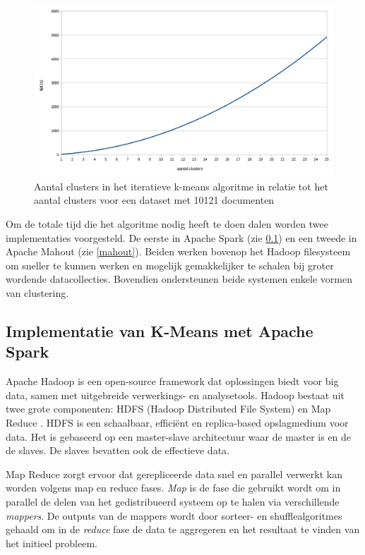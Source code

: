 \begin{figure}[h]
	\caption{Aantal clusters in het iteratieve k-means algoritme in relatie tot het aantal clusters voor een dataset met 10121 documenten}
	\label{fig:clustering-10000-exp}	
	\includegraphics[width=\textwidth]{fig/clustering-10000-exp.png}
\end{figure}

Om de totale tijd die het algoritme nodig heeft te doen dalen worden twee implementaties voorgesteld. De eerste in Apache Spark (zie \ref{spark}) en een tweede in Apache Mahout (zie \ref{mahout}). Beiden werken bovenop het Hadoop filesysteem om sneller te kunnen werken en mogelijk gemakkelijker te schalen bij groter wordende datacollecties. Bovendien ondersteunen beide systemen enkele vormen van clustering. 

\subsection{Implementatie van K-Means met Apache Spark}\label{spark}
Apache Hadoop \cite{hadoop} is een open-source framework dat oplossingen biedt voor big data, samen met uitgebreide verwerkings- en analysetools. Hadoop bestaat uit twee grote componenten: HDFS (Hadoop Distributed File System) en Map Reduce \cite{Dean}. HDFS is een schaalbaar, effici\"ent en replica-based opslagmedium voor data. Het is gebaseerd op een master-slave architectuur waar  de master is en de  de slaves. De slaves bevatten ook de effectieve data. 

Map Reduce zorgt ervoor dat gerepliceerde data snel en parallel verwerkt kan worden volgens map en reduce fases. \textit{Map} is de fase die gebruikt wordt om in parallel de delen van het gedistribueerd systeem op te halen via verschillende \textit{mappers}. De outputs van de mappers wordt door sorteer- en shufflealgoritmes gehaald om in de \textit{reduce} fase de data te aggregeren en het resultaat te vinden van het initieel probleem.

